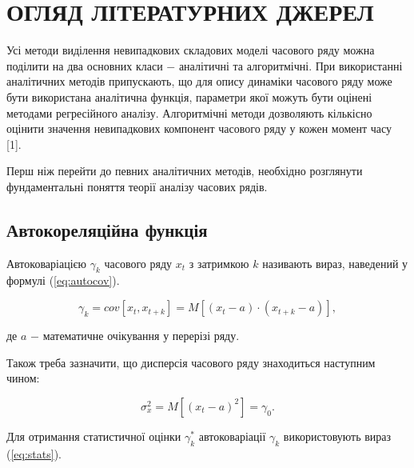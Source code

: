 \section{ОГЛЯД ЛІТЕРАТУРНИХ ДЖЕРЕЛ}
\label{sec:Theory}



Усі методи виділення невипадкових складових моделі часового ряду можна поділити на два основних класи $-$ аналітичні та алгоритмічні. При використанні аналітичних методів припускають, що для опису динаміки часового ряду може бути використана аналітична функція, параметри якої можуть бути оцінені методами регресійного аналізу. Алгоритмічні методи дозволяють кількісно оцінити значення невипадкових компонент часового ряду у кожен момент часу [1].

Перш ніж перейти до певних аналітичних методів, необхідно розглянути фундаментальні поняття теорії аналізу часових рядів.

\subsection{Автокореляційна функція}

Автоковаріацією $\gamma_{k}$ часового ряду $x_{t}$ з затримкою $k$ називають вираз, наведений у формулі (\ref{eq:autocov}).

\begin{equation}\label{eq:autocov}
\gamma_{k} = cov[x_{t}, x_{t+k}] = M[(x_{t} - a) \cdot (x_{t+k} - a)],
\end{equation}

\noindent де $a$ $-$ математичне очікування у перерізі ряду.

\vspace{1.5em}

Також треба зазначити, що дисперсія часового ряду знаходиться наступним чином:

\begin{equation}\label{eq:cov}
\sigma^{2}_{x} = M[(x_{t} - a)^2] = \gamma_{0}.
\end{equation}

\vspace{1.5em}

Для отримання статистичної оцінки $\gamma^{*}_{k}$ автоковаріації $\gamma_{k}$ використовують вираз (\ref{eq:stats}).

